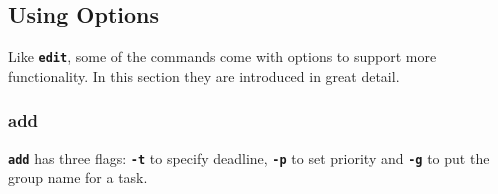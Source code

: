 \documentclass[12pt, a4paper]{article}
\newcommand{\cmdinline}[1]{{\bf \texttt{#1}}}
\begin{document}
\subsection{Using Options}

Like \cmdinline{edit}, some of the commands come with options to support more functionality.
In this section they are introduced in great detail.


\subsubsection{add}
\cmdinline{add} has three flags: \cmdinline{-t} to specify deadline, \cmdinline{-p} to set priority and \cmdinline{-g} to put the group name for a task.
\end{document}
